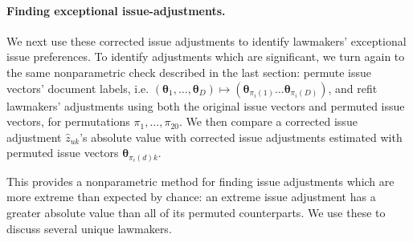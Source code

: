 \paragraph{Finding exceptional issue-adjustments.}



We next use these corrected issue adjustments to identify lawmakers'
exceptional issue preferences. To identify adjustments which are
significant, we turn again to the same nonparametric check described
in the last section: permute issue vectors' document labels,
i.e. $(\bm \theta_1, \ldots, \bm \theta_D) \mapsto (\bm
\theta_{\pi_i(1)} \ldots \bm \theta_{\pi_i(D)})$, and refit lawmakers'
adjustments using both the original issue vectors and permuted issue
vectors, for permutations $\pi_1, \ldots, \pi_{20}$.  We then compare
a corrected issue adjustment $\hat z_{uk}$'s absolute value with
corrected issue adjustments estimated with permuted issue vectors $\bm
\theta_{\pi_i(d) k}$.

This provides a nonparametric method for finding issue adjustments
which are more extreme than expected by chance: an extreme issue
adjustment has a greater absolute value than all of its permuted
counterparts.  We use these to discuss several unique lawmakers.

